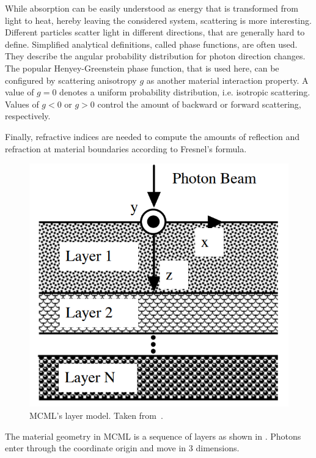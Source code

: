 \documentclass[]{article}
\begin{document}
While absorption can be easily understood as energy that is transformed from light to heat, hereby leaving the considered system, scattering is more interesting. Different particles scatter light in different directions, that are generally hard to define. Simplified analytical definitions, called phase functions, are often used. They describe the angular probability distribution for photon direction changes. The popular Henyey-Greenstein phase function, that is used here, can be configured by scattering anisotropy $g$ as another material interaction property. A value of $g=0$ denotes a uniform probability distribution, i.e. isotropic scattering. Values of $g<0$ or $g>0$ control the amount of backward or forward scattering, respectively.

Finally, refractive indices are needed to compute the amounts of reflection and refraction at material boundaries according to Fresnel's formula.

\begin{figure}[ht!]
	\includegraphics[width=\linewidth]{img/layer-model.png}
	\caption{MCML's layer model. Taken from~\cite{wang1992monte}.}
	\label{layer-model}
\end{figure}

The material geometry in MCML is a sequence of layers as shown in . Photons enter through the coordinate origin and move in 3 dimensions.
\end{document}
